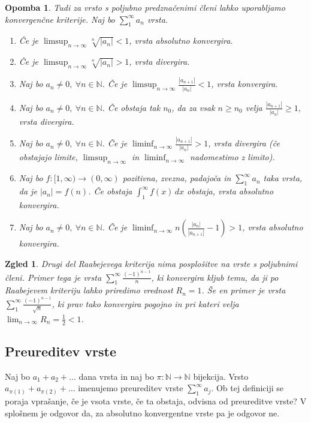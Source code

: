 \documentclass[10pt, a4paper]{article}
\newtheorem*{opomba}{Opomba}
\newtheorem{zgled}{Zgled}[section]
\newcommand{\N}{\mathbb {N}}
\newcommand{\limzap}[1]{\lim_{n \to \infty} {#1}}
\begin{document}
\begin{opomba}
    Tudi za vrsto s poljubno predznačenimi členi lahko uporabljamo konvergenčne kriterije.
    Naj bo $\sum_1 ^\infty a_n$ vrsta.
    \begin{enumerate}
        \item Če je $\limsup_{n \to \infty} \sqrt[n]{|a_n|} < 1$, vrsta absolutno konvergira.
        \item Če je $\limsup_{n \to \infty} \sqrt[n]{|a_n|} > 1$, vrsta divergira.
        \item Naj bo $a_n \neq 0,\ \forall n \in \N$. 
        Če je $\limsup_{n \to \infty} \frac{|a_{n+1}|}{|a_n|} < 1$, vrsta konvergira.
        \item Naj bo $a_n \neq 0,\ \forall n \in \N$.
        Če obstaja tak $n_0$, da za vsak $n \geq n_0$ velja $\frac{|a_{n+1}|}{|a_n|} \geq 1,$ vrsta divergira.
        \item Naj bo $a_n \neq 0,\ \forall n \in \N$. 
        Če je $\liminf_{n \to \infty} \frac{|a_{n+1}|}{|a_n|} > 1$, vrsta divergira (če obstajajo limite, $\limsup_{n \to \infty}$ in $\liminf_{n \to \infty}$ nadomestimo z limito).
        \item Naj bo $f:[1, \infty) \rightarrow (0, \infty)$ pozitivna, zvezna, padajoča in $\sum_1 ^\infty a_n$ taka vrsta, da je $|a_n| = f(n)$. Če obstaja $\int_1 ^\infty f(x)\,dx$ obstaja, vrsta absolutno konvergira.
        \item Naj bo $a_n \neq 0,\ \forall n \in \N$. Če je $\liminf_{n \to \infty} n \left(\frac{|a_n|}{|a_{n+1}|} - 1\right) > 1$, vrsta absolutno konvergira.
    \end{enumerate}
\end{opomba}

\begin{zgled}
    Drugi del Raabejevega kriterija nima posplošitve na vrste s poljubnimi členi.
    Primer tega je vrsta $\sum_1 ^\infty \frac{(-1)^{n-1}}{n}$, ki konvergira kljub temu, da ji po Raabejevem kriteriju lahko priredimo vrednost $R_n = 1$.
    Še en primer je vrsta $\sum_1 ^\infty \frac{(-1)^{n-1}}{\sqrt{n}}$, ki prav tako konvergira pogojno in pri kateri velja $\limzap{R_n} = \frac{1}{2} < 1$.
\end{zgled}

\subsection{Preureditev vrste}

Naj bo $a_1 + a_2 + \dots$ dana vrsta in naj bo $\pi: \N \rightarrow \N$ bijekcija.
Vrsto $a_{\pi(1)} + a_{\pi(2)} + \dots$ imenujemo preureditev vrste $\sum_1 ^\infty a_j$.
Ob tej definiciji se poraja vprašanje, če je vsota vrste, če ta obstaja, odvisna od preureditve vrste?
V splošnem je odgovor da, za absolutno konvergentne vrste pa je odgovor ne.
\end{document}
